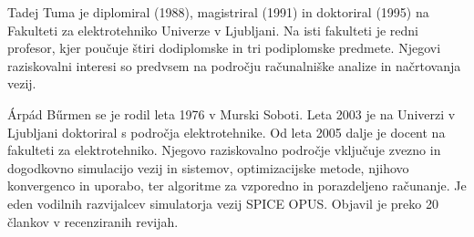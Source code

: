 \documentclass[journal,a4paper,twoside]{sty/IEEEtran}
\begin{document}
\begin{IEEEbiographynophoto}{Tadej Tuma} je diplomiral (1988), magistriral (1991) in doktoriral (1995) na Fakulteti za elektrotehniko Univerze v Ljubljani. Na isti fakulteti je redni profesor, kjer poučuje štiri dodiplomske in tri podiplomske predmete. Njegovi raziskovalni interesi so predvsem na področju računalniške analize in načrtovanja vezij.
\end{IEEEbiographynophoto}

\begin{IEEEbiographynophoto}{\'{A}rp\'{a}d B\H{u}rmen} se je rodil leta 1976 v Murski Soboti. Leta 2003 je na Univerzi v Ljubljani doktoriral s področja elektrotehnike. Od leta 2005 dalje je docent na fakulteti za elektrotehniko. Njegovo raziskovalno področje vključuje zvezno in dogodkovno simulacijo vezij in sistemov, optimizacijske metode, njihovo konvergenco in uporabo, ter algoritme za vzporedno in porazdeljeno računanje. Je eden vodilnih razvijalcev simulatorja vezij SPICE OPUS. Objavil je preko 20 člankov v recenziranih revijah.
\end{IEEEbiographynophoto}

\vfill

\label{finish}

\end{document}

